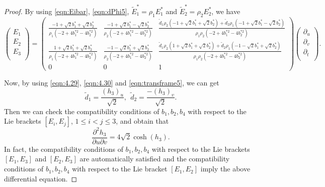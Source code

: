 \documentclass[reqno]{amsart}%
\theoremstyle{definition}
\numberwithin{equation}{section}
\begin{document}
\begin{proof}
By using \eqref{eqn:Eibar}, \eqref{eqn:dPhi5}, $\tilde{E}_1^*=\rho_1E_1^*$
and $\tilde{E}_2^*=\rho_2E_2^*$, we have
\begin{equation}\label{eqn:transframe5}
\left(
  \begin{array}{c}
    E_1 \\
    E_2 \\
    E_3 \\
  \end{array}
\right)
=\left(\begin{array}{cccc}
\frac{-1+\sqrt{2}b_1^*+\sqrt{2}b_2^*}{\rho_1(-2+4b_1^{*2}-4b_2^{*2})} & \frac{-1+\sqrt{2}b_1^*-\sqrt{2}b_2^*}{\rho_2(-2+4b_1^{*2}-4b_2^{*2})} & %
\frac{\tilde{d}_1\rho_2(-1+\sqrt{2}b_1^*+\sqrt{2}b_2^*)+\tilde{d}_2\rho_1(-1+\sqrt{2}b_1^*-\sqrt{2}b_2^*)}
{\rho_1\rho_2(-2+4b_1^{*2}-4b_2^{*2})}\\
\frac{1+\sqrt{2}b_1^*+\sqrt{2}b_2^*}{\rho_1(-2+4b_1^{*2}-4b_2^{*2})} & \frac{-1-\sqrt{2}b_1^*+\sqrt{2}b_2^*}{\rho_2(-2+4b_1^{*2}-4b_2^{*2})} & %
\frac{\tilde{d}_1\rho_2(1+\sqrt{2}b_1^*+\sqrt{2}b_2^*)+\tilde{d}_2\rho_1(-1-\sqrt{2}b_1^*+\sqrt{2}b_2^*)}
{\rho_1\rho_2(-2+4b_1^{*2}-4b_2^{*2})}
\\
0 & 0 & 1
\end{array}\right)
\left(
  \begin{array}{c}
    \partial_u \\
    \partial_v \\
    \partial_t \\
  \end{array}
\right).
\end{equation}

Now, by using \eqref{eqn:4.29}, \eqref{eqn:4.30} and \eqref{eqn:transframe5}, we can get
$$
\tilde{d}_1=\frac{(h_3)_u}{\sqrt{2}},\ \ \tilde{d}_2=\frac{-(h_3)_v}{\sqrt{2}}.
$$
Then we can check the compatibility conditions of $b_1,b_2,b_4$ with respect to the Lie brackets $[E_i,E_j]$, $1\leq i<j\leq3$,
and obtain that
$$
\frac{\partial^2 h_3}{\partial u \partial v}
=4\sqrt{2}\cosh(h_3).
$$
In fact, the  compatibility conditions of  $b_1,b_2,b_4$  with respect to the Lie brackets $[E_1,E_3]$ and $[E_2,E_3]$ are automatically satisfied and the  compatibility conditions of  $b_1,b_2,b_4$  with respect to the Lie bracket $[E_1,E_2]$  imply the above differential equation.


\end{proof}
\end{document}
